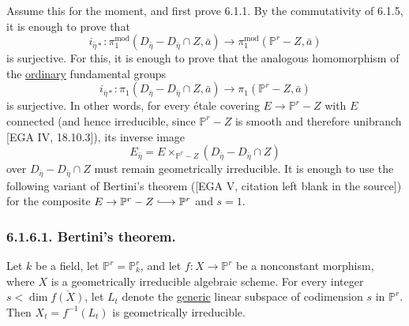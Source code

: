 Assume this for the moment, and first prove 6.1.1.  By the commutativity of
6.1.5, it is enough to prove that
\[
i_{\bar\eta*}:
\pi_1^{\mathrm{mod}}(D_{\bar\eta}-D_{\bar\eta}\cap Z,\bar a)
\longrightarrow
\pi_1^{\mathrm{mod}}(\mathbb P^r-Z,\bar a)
\]
is surjective.  For this, it is enough to prove that the analogous
homomorphism of the \underline{ordinary} fundamental groups
\begin{equation}\tag{6.1.6}
i_{\bar\eta*}:
\pi_1(D_{\bar\eta}-D_{\bar\eta}\cap Z,\bar a)
\longrightarrow
\pi_1(\mathbb P^r-Z,\bar a)
\end{equation}
is surjective.  In other words, for every étale covering
$E\to\mathbb P^r-Z$ with $E$ connected (and hence irreducible, since
$\mathbb P^r-Z$ is smooth and therefore unibranch [EGA IV, 18.10.3]), its
inverse image
\[
E_{\bar\eta}
=E\times_{\mathbb P^r-Z}(D_{\bar\eta}-D_{\bar\eta}\cap Z)
\]
over $D_{\bar\eta}-D_{\bar\eta}\cap Z$ must remain geometrically
irreducible.  It is enough to use the following variant of Bertini's theorem
([EGA V, citation left blank in the source]) for the composite
$E\to\mathbb P^r-Z\lhook\joinrel\longrightarrow\mathbb P^r$ and $s=1$.

\subsubsection*{6.1.6.1. Bertini's theorem.}
Let $k$ be a field, let $\mathbb P^r=\mathbb P^r_k$, and let
$f:X\to\mathbb P^r$ be a nonconstant morphism, where $X$ is a geometrically
irreducible algebraic scheme.  For every integer
$s<\dim\overline{f(X)}$, let $L_t$ denote the \underline{generic} linear
subspace of codimension $s$ in $\mathbb P^r$.  Then
$X_t=f^{-1}(L_t)$ is geometrically irreducible.
